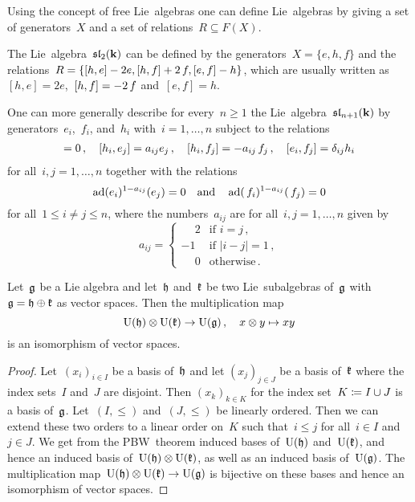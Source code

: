 \begin{remark}
  Using the concept of free Lie~algebras one can define Lie~algebras by giving a set of generators~$X$ and a set of relations~$R \subseteq F(X)$.
\end{remark}


\begin{example}
  The Lie~algebra~$\mathfrak{sl}_2(\mathbf{k})$ can be defined by the generators~$X = \{e, h, f\}$ and the relations~$R = \{[h,e] - 2e, [h,f] + 2\, f, [e,f] - h\}$, which are usually written as~$[h,e] = 2e$,~$[h,f] = -2\, f$ and~$[e,f] = h$.
  
  One can more generally describe for every~$n \geq 1$ the Lie~algebra~$\mathfrak{sl}_{n+1}(\mathbf{k})$ by generators~$e_i$,~$f_i$, and~$h_i$ with~$i = 1, \dotsc, n$ subject to the relations
  \begin{align*}
    [h_i, h_j] = 0  \,,
    \quad
    [h_i, e_j] = a_{ij} e_j \,,
    \quad
    [h_i, f_j] = -a_{ij}\spacing f_j  \,,
    \quad
    [e_i, f_j] = \delta_{ij} h_i
  \end{align*}
  for all~$i,j = 1, \dotsc, n$ together with the relations
  \[
    \operatorname{ad}(e_i)^{1-a_{ij}}(e_j) = 0
    \quad\text{and}\quad
    \operatorname{ad}(\, f_i)^{1-a_{ij}}(\, f_j) = 0
  \]
  for all~$1 \leq i \neq j \leq n$, where the numbers~$a_{ij}$ are for all~$i,j = 1, \dotsc, n$ given by
  \[
    a_{ij} =
    \begin{cases}
    \phantom{-}2 & \text{if $i = j$}  \,, \\
              -1 & \text{if $|i-j| = 1$}  \,, \\
    \phantom{-}0 & \text{otherwise} \,.
    \end{cases}
  \]
\end{example}


\begin{corollary}
  \label{uea of direct sum of subspaces}
  Let~$\mathfrak{g}$ be a Lie algebra and let~$\mathfrak{h}$ and~$\mathfrak{k}$ be two Lie~subalgebras of~$\mathfrak{g}$ with~$\mathfrak{g} = \mathfrak{h} \oplus \mathfrak{k}$ as vector spaces.
  Then the multiplication map
  \[
    \operatorname{U}(\mathfrak{h}) \otimes \operatorname{U}(\mathfrak{k})
    \to
    \operatorname{U}(\mathfrak{g}) \,,
    \quad
    x \otimes y
    \mapsto
    xy
  \]
  is an isomorphism of vector spaces.
\end{corollary}


\begin{proof}
  Let~$(x_i)_{i \in I}$ be a basis of~$\mathfrak{h}$ and let $(x_j)_{j \in J}$ be a basis of~$\mathfrak{k}$ where the index sets~$I$ and~$J$ are disjoint.
  Then $(x_k)_{k \in K}$ for the index set~$K \coloneqq I \cup J$ is a basis of~$\mathfrak{g}$.
  Let~$(I, \leq)$ and~$(J, \leq)$ be linearly ordered.
  Then we can extend these two orders to a linear order on~$K$ such that~$i \leq j$ for all~$i \in I$ and~$j \in J$.
  We get from the PBW~theorem induced bases of~$\operatorname{U}(\mathfrak{h})$ and~$\operatorname{U}(\mathfrak{k})$, and hence an induced basis of~$\operatorname{U}(\mathfrak{h}) \otimes \operatorname{U}(\mathfrak{k})$, as well as an induced basis of~$\operatorname{U}(\mathfrak{g})$.
  The multiplication map~$\operatorname{U}(\mathfrak{h}) \otimes \operatorname{U}(\mathfrak{k}) \to \operatorname{U}(\mathfrak{g})$ is bijective on these bases and hence an isomorphism of vector spaces.
\end{proof}


